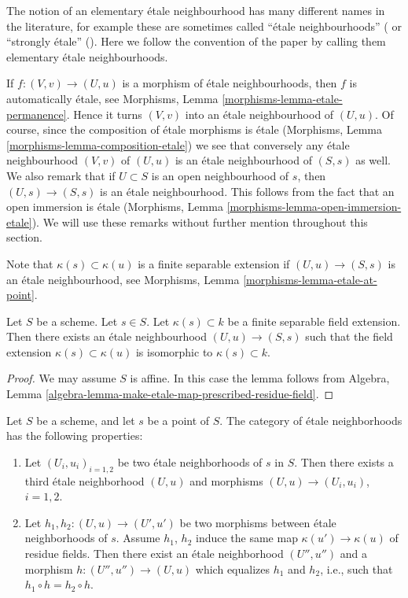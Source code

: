 \noindent
The notion of an elementary \'etale neighbourhood has many different
names in the literature, for example these are sometimes called
``\'etale neighbourhoods'' (\cite[Page 36]{Milne} or
``strongly \'etale'' (\cite[Page 108]{KPR}).
Here we follow the convention of the paper
\cite{GruRay} by calling them elementary \'etale neighbourhoods.

\medskip\noindent
If $f : (V, v) \to (U, u)$ is a morphism of \'etale
neighbourhoods, then $f$ is automatically \'etale, see
Morphisms, Lemma \ref{morphisms-lemma-etale-permanence}.
Hence it turns $(V, v)$ into an \'etale neighbourhood of
$(U, u)$. Of course, since the composition of \'etale morphisms
is \'etale (Morphisms, Lemma \ref{morphisms-lemma-composition-etale})
we see that conversely any \'etale neighbourhood $(V, v)$ of
$(U, u)$ is an \'etale neighbourhood of $(S, s)$ as well.
We also remark that if $U \subset S$ is an open neighbourhood
of $s$, then $(U, s) \to (S, s)$ is an \'etale neighbourhood.
This follows from the fact that an open immersion is
\'etale (Morphisms, Lemma \ref{morphisms-lemma-open-immersion-etale}).
We will use these remarks without further mention throughout this
section.

\medskip\noindent
Note that $\kappa(s) \subset \kappa(u)$ is a finite separable extension
if $(U, u) \to (S, s)$ is an \'etale neighbourhood,
see Morphisms, Lemma \ref{morphisms-lemma-etale-at-point}.

\begin{lemma}
\label{lemma-realize-prescribed-residue-field-extension-etale}
Let $S$ be a scheme.
Let $s \in S$.
Let $\kappa(s) \subset k$ be a finite separable field extension.
Then there exists an \'etale neighbourhood $(U, u) \to (S, s)$
such that the field extension $\kappa(s) \subset \kappa(u)$ is
isomorphic to $\kappa(s) \subset k$.
\end{lemma}

\begin{proof}
We may assume $S$ is affine.
In this case the lemma follows from
Algebra, Lemma \ref{algebra-lemma-make-etale-map-prescribed-residue-field}.
\end{proof}

\begin{lemma}
\label{lemma-etale-neighbourhoods-not-quite-filtered}
Let $S$ be a scheme, and let $s$ be a point of $S$.
The category of \'etale neighborhoods has the following properties:
\begin{enumerate}
\item Let $(U_i, u_i)_{i=1, 2}$ be two \'etale neighborhoods of
$s$ in $S$. Then there exists a third \'etale neighborhood
$(U, u)$ and morphisms
$(U, u) \to (U_i, u_i)$, $i = 1, 2$.
\item Let $h_1, h_2: (U, u) \to (U', u')$ be two
morphisms between \'etale neighborhoods of $s$.
Assume $h_1$, $h_2$ induce the same map $\kappa(u') \to \kappa(u)$ of residue
fields. Then there exist an \'etale neighborhood $(U'', u'')$ and a morphism
$h : (U'', u'') \to (U, u)$
which equalizes $h_1$ and $h_2$, i.e., such that
$h_1 \circ h = h_2 \circ h$.
\end{enumerate}
\end{lemma}

